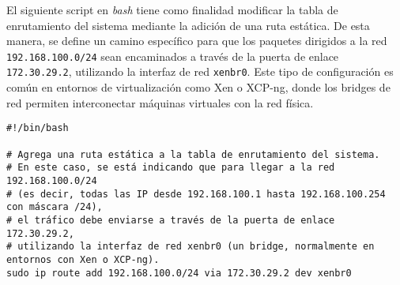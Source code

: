 El siguiente script en \textit{bash} tiene como finalidad modificar la tabla de enrutamiento del sistema mediante la adición de una ruta estática. 
De esta manera, se define un camino específico para que los paquetes dirigidos a la red \texttt{192.168.100.0/24} sean encaminados a través de la 
puerta de enlace \texttt{172.30.29.2}, utilizando la interfaz de red \texttt{xenbr0}. 
Este tipo de configuración es común en entornos de virtualización como Xen o XCP-ng, donde los bridges de red permiten interconectar  máquinas virtuales con la red física.

\begin{verbatim}
#!/bin/bash

# Agrega una ruta estática a la tabla de enrutamiento del sistema.
# En este caso, se está indicando que para llegar a la red 192.168.100.0/24 
# (es decir, todas las IP desde 192.168.100.1 hasta 192.168.100.254 con máscara /24),
# el tráfico debe enviarse a través de la puerta de enlace 172.30.29.2,
# utilizando la interfaz de red xenbr0 (un bridge, normalmente en entornos con Xen o XCP-ng).
sudo ip route add 192.168.100.0/24 via 172.30.29.2 dev xenbr0
\end{verbatim}